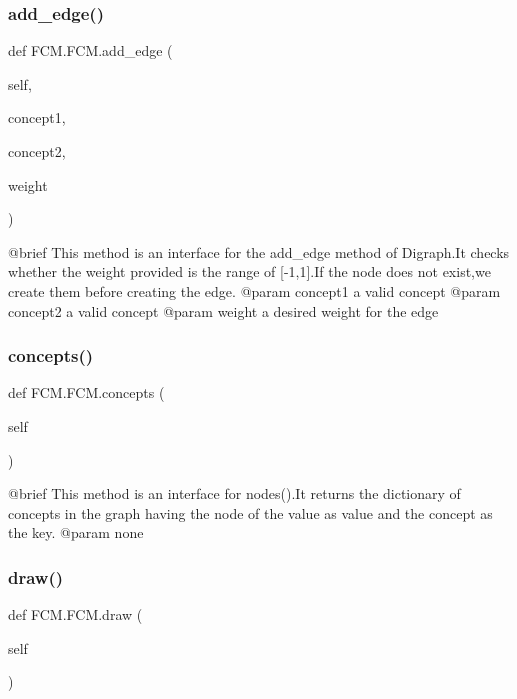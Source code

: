 \subsubsection{\texorpdfstring{add\+\_\+edge()}{add\_edge()}}
{\footnotesize\ttfamily def F\+C\+M.\+F\+C\+M.\+add\+\_\+edge (\begin{DoxyParamCaption}\item[{}]{self,  }\item[{}]{concept1,  }\item[{}]{concept2,  }\item[{}]{weight }\end{DoxyParamCaption})}

\begin{DoxyVerb}@brief This method is an interface for the add_edge method of Digraph.It checks whether the weight provided is the range of [-1,1].If the node does not exist,we create them before creating the edge.
@param concept1 a valid concept
@param concept2 a valid concept
@param weight a desired weight for the edge
\end{DoxyVerb}
 \hypertarget{class_f_c_m_1_1_f_c_m_abd95880fc46feca8042343b1556b61f1}{}\label{class_f_c_m_1_1_f_c_m_abd95880fc46feca8042343b1556b61f1} 
\subsubsection{\texorpdfstring{concepts()}{concepts()}}
{\footnotesize\ttfamily def F\+C\+M.\+F\+C\+M.\+concepts (\begin{DoxyParamCaption}\item[{}]{self }\end{DoxyParamCaption})}

\begin{DoxyVerb}@brief This method is an interface for nodes().It returns the dictionary of concepts in the graph having the node of the value as value and the concept as the key.
@param none
\end{DoxyVerb}
 \hypertarget{class_f_c_m_1_1_f_c_m_a97f12131aafc3d810da3ff95fb69ae1d}{}\label{class_f_c_m_1_1_f_c_m_a97f12131aafc3d810da3ff95fb69ae1d} 
\subsubsection{\texorpdfstring{draw()}{draw()}}
{\footnotesize\ttfamily def F\+C\+M.\+F\+C\+M.\+draw (\begin{DoxyParamCaption}\item[{}]{self }\end{DoxyParamCaption})}

